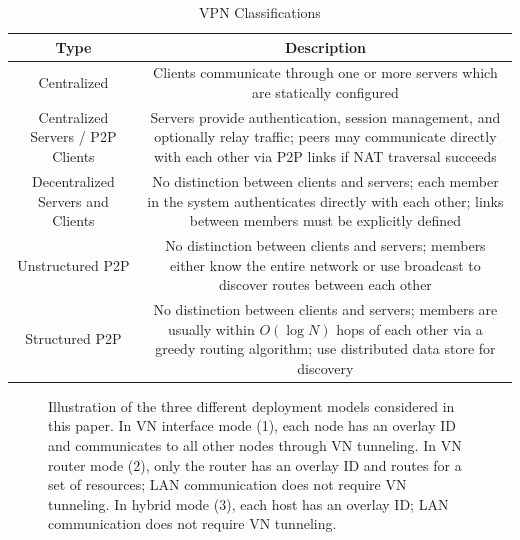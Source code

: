\begin{table}[ht]
\caption{VPN Classifications}
\label{tab:vpn_types}
\begin{center}
\begin{tabular*}{0.75\textwidth}{|c|c|} \hline
Type & Description \\ \hline
Centralized & Clients communicate through one or more servers which are statically
configured \\ \hline
Centralized Servers / P2P Clients & Servers provide authentication, session management, and
optionally relay traffic; peers may communicate directly with each
other via P2P links if NAT traversal succeeds\\ \hline
Decentralized Servers and Clients & No distinction between clients and servers;
each member in the system authenticates directly with each other; links between
members must be explicitly defined \\ \hline
Unstructured P2P & No distinction between clients and servers; members either know
the entire network or use broadcast to discover routes between each other \\ \hline
Structured P2P & No distinction between clients and servers; members are usually
within $O(\log N)$ hops of each other via a greedy routing algorithm; use
distributed data store for discovery \\ \hline
\end{tabular*}
\end{center}
\end{table}

\clearpage

\begin{figure}[ht]
\centering
{}
\caption[Three VN Approaches]{Illustration of the three different deployment
models considered in this paper. In VN interface mode (1), each node has an
overlay ID and communicates to all other nodes through VN tunneling. In VN
router mode (2), only the router has an overlay ID and routes for a set of
resources; LAN communication does not require VN tunneling. In hybrid mode
(3), each host has an overlay ID; LAN communication does not require VN
tunneling.}
\label{fig:three_models}
\end{figure}

